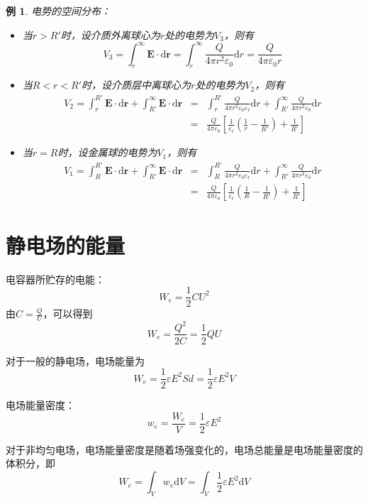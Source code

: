 \documentclass[12pt, a4paper, twoside]{ctexbook}
\newtheorem{example}[theorem]{例}
\begin{document}
\begin{example}
    {\sonti 电势的空间分布}：
    \begin{itemize}
        \item 当$r>R'$时，设介质外离球心为$r$处的电势为$V_3$，则有
        $$
        V_3=\int_{r}^{\infty}\boldsymbol{E}\cdot\mathrm{d}\boldsymbol{r}=\int_{r}^{\infty}\frac{Q}{4\pi r^2\varepsilon _0}\mathrm{d}r=\frac{Q}{4\pi\varepsilon_0r}
        $$
        \item 当$R<r<R'$时，设介质层中离球心为$r$处的电势为$V_2$，则有
        \begin{eqnarray}
            V_2=\int_{r}^{R'}\boldsymbol{E}\cdot\mathrm{d}\boldsymbol{r}+\int_{R'}^{\infty}\boldsymbol{E}\cdot\mathrm{d}\boldsymbol{r} &=& \int_{r}^{R'}\frac{Q}{4\pi r^2\varepsilon _0\varepsilon _{\text{r}}}\mathrm{d}r+\int_{R'}^{\infty}\frac{Q}{4\pi r^2\varepsilon _0}\mathrm{d}r \nonumber \\
            ~&=& \frac{Q}{4\pi\varepsilon_0}\left[\frac{1}{\varepsilon_{\mathrm{r}}}\left(\frac{1}{r}-\frac{1}{R'}\right)+\frac{1}{R'}\right] \nonumber
        \end{eqnarray}
        \item 当$r=R$时，设金属球的电势为$V_1$，则有
        \begin{eqnarray}
            V_1=\int_{R}^{R'}\boldsymbol{E}\cdot\mathrm{d}\boldsymbol{r}+\int_{R'}^{\infty}\boldsymbol{E}\cdot\mathrm{d}\boldsymbol{r} &=& \int_{R}^{R'}\frac{Q}{4\pi r^2\varepsilon _0\varepsilon _{\text{r}}}\mathrm{d}r+\int_{R'}^{\infty}\frac{Q}{4\pi r^2\varepsilon _0}\mathrm{d}r \nonumber \\
            ~&=& \frac{Q}{4\pi\varepsilon_0}\left[\frac{1}{\varepsilon_{\mathrm{r}}}\left(\frac{1}{R}-\frac{1}{R'}\right)+\frac{1}{R'}\right] \nonumber
        \end{eqnarray}
    \end{itemize}
\end{example}
\section{静电场的能量}
{\sonti 电容器所贮存的电能}：
$$
W_e=\frac{1}{2}CU^2
$$
由$C=\frac{Q}{U}$，可以得到
$$
W_e=\frac{Q^2}{2C}=\frac{1}{2}QU
$$

对于一般的静电场，电场能量为
$$
W_e=\frac{1}{2}\varepsilon E^2 Sd=\frac{1}{2}\varepsilon E^2 V
$$

{\sonti 电场能量密度}：
$$
w_e=\frac{W_e}{V}=\frac{1}{2}\varepsilon E^2
$$

对于非均匀电场，电场能量密度是随着场强变化的，电场总能量是电场能量密度的体积分，即
$$
W_e=\int_V w_e\mathrm{d}V=\int_V \frac{1}{2}\varepsilon E^2\mathrm{d}V
$$
\end{document}
